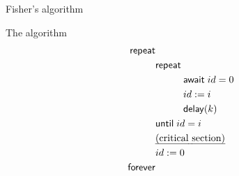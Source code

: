 \documentclass[aspectratio=169]{beamer}
\begin{document}
\begin{slide}{Fisher's algorithm}
\small

\begin{block}{The algorithm}
\begin{align*}
\mathsf{repeat} & \\
& \mathsf{repeat}  \\
&  \hspace{1cm} \mathsf{await} \; id = 0\\
& \hspace{1cm} id := i\\
& \hspace{1cm}  \mathsf{delay}(k)\\ 
& \mathsf{until}\; id=i  \\
& \text{\emph{(critical section)}}\\
& id := 0\\
\mathsf{forever} &
\end{align*}
\end{block}
\end{slide}


%
\end{document}
